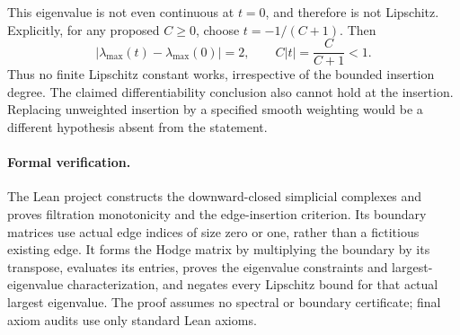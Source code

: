 \documentclass[11pt]{article}
\begin{document}
This eigenvalue is not even continuous at $t=0$, and therefore is not Lipschitz. Explicitly, for any proposed $C\ge0$, choose $t=-1/(C+1)$. Then
\[
 |\lambda_{\max}(t)-\lambda_{\max}(0)|=2,
 \qquad C|t|=\frac{C}{C+1}<1.
\]
Thus no finite Lipschitz constant works, irrespective of the bounded insertion degree. The claimed differentiability conclusion also cannot hold at the insertion. Replacing unweighted insertion by a specified smooth weighting would be a different hypothesis absent from the statement.

\paragraph{Formal verification.}\sloppy
The Lean project constructs the downward-closed simplicial complexes and proves filtration monotonicity and the edge-insertion criterion. Its boundary matrices use actual edge indices of size zero or one, rather than a fictitious existing edge. It forms the Hodge matrix by multiplying the boundary by its transpose, evaluates its entries, proves the eigenvalue constraints and largest-eigenvalue characterization, and negates every Lipschitz bound for that actual largest eigenvalue. The proof assumes no spectral or boundary certificate; final axiom audits use only standard Lean axioms.
\end{document}
